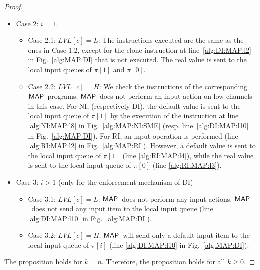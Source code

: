 \documentclass[10pt,a4paper,oneside]{article}
\def\LVL{\ensuremath{LVL}}
\def\chnl{\ensuremath{c}}
\def\sanserif#1{\ensuremath{\sf #1}}
\def\MAP{\ensuremath{\sanserif{MAP}}}
\def\Prog{\ensuremath{\pi}}
\def\Progl#1{\ensuremath{\Prog[#1]}}
\begin{document}
\begin{proof}
\begin{itemize}
\item Case 2: $i = 1$.
	\begin{itemize}
	\item Case 2.1: $\LVL[\chnl] = L$: The instructions executed are the same as the ones in Case 1.2, except for the clone instruction at line~\ref{alg:DI:MAP:l2} in Fig.~\ref{alg:MAP:DI} that is not executed. The real value is sent to the local input queues of  \Progl{1} and \Progl{0}.
	
	\item Case 2.2: $\LVL[\chnl] = H$: We check the instructions of the corresponding \MAP\ programs. \MAP\ does not perform an input action on low channels in this case. For NI, (respectively DI), the default value is sent to the local input queue of \Progl{1} by the execution of the instruction at line \ref{alg:NI:MAP:l8} in Fig.~\ref{alg:MAP:NI:SME} (resp. line~\ref{alg:DI:MAP:l10} in Fig.~\ref{alg:MAP:DI}). For RI, an input operation is performed (line \ref{alg:RI:MAP:l2} in Fig.~\ref{alg:MAP:RI}). However, a default value is sent to the local input queue of \Progl{1} (line \ref{alg:RI:MAP:l4}), while the real value is sent to the local input queue of \Progl{0} (line \ref{alg:RI:MAP:l3}).
	\end{itemize}
	
\item Case 3: $i > 1$ (only for the enforcement mechanism of DI)
	\begin{itemize}
	\item Case 3.1: $\LVL[\chnl] = L$: \MAP\ does not perform any input actions. \MAP\ does not send any input item to the local input queue (line \ref{alg:DI:MAP:l10} in Fig.~\ref{alg:MAP:DI}).
	\item Case 3.2: $\LVL[\chnl] = H$: \MAP\ will send only a default input item to the local input queue of \Progl{i} (line \ref{alg:DI:MAP:l10} in Fig.~\ref{alg:MAP:DI}).
	\end{itemize}

\end{itemize}

The proposition holds for $k = n$. Therefore, the proposition holds for all $k \geq 0$.
\end{proof}
\end{document}
